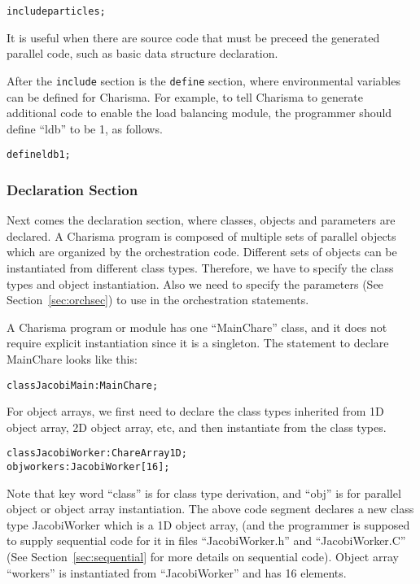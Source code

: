 \documentclass[10pt]{article}
\begin{document}
\begin{alltt}
    include particles;
\end{alltt}

It is useful when there are source code that must be preceed the generated
parallel code, such as basic data structure declaration. 

After the {\tt include} section is the {\tt define} section, where environmental
variables can be defined for Charisma. For example, to tell Charisma to generate
additional code to enable the load balancing module, the programmer should
define ``ldb'' to be 1, as follows.

\begin{alltt}
    define ldb 1;
\end{alltt}

\subsubsection{Declaration Section}

Next comes the declaration section, where classes, objects and parameters are
declared. A Charisma program is composed of multiple sets of parallel objects
which are organized by the orchestration code. Different sets of objects can be
instantiated from different class types. Therefore, we have to specify the class
types and object instantiation. Also we need to specify the parameters (See
Section~\ref{sec:orchsec}) to use in the orchestration statements. 

A Charisma program or module has one ``MainChare'' class, and it does not
require explicit instantiation since it is a singleton. The statement to declare
MainChare looks like this:

\begin{alltt}
    class JacobiMain : MainChare;
\end{alltt}

For object arrays, we first need to declare the class types inherited from 1D
object array, 2D object array, etc, and then instantiate from the class types. 

\begin{alltt}
    class JacobiWorker : ChareArray1D;
    obj workers : JacobiWorker[16];
\end{alltt}

Note that key word ``class'' is for class type derivation, and ``obj'' is for
parallel object or object array instantiation. The above code segment declares a
new class type JacobiWorker which is a 1D object array, (and the programmer is
supposed to supply sequential code for it in files ``JacobiWorker.h'' and
``JacobiWorker.C'' (See Section~\ref{sec:sequential} for more details on
sequential code). Object array ``workers'' is instantiated from ``JacobiWorker''
and has 16 elements.
\end{document}
